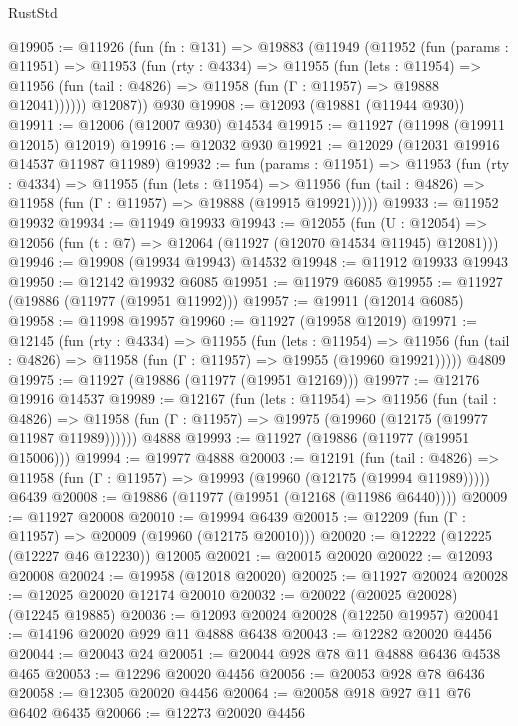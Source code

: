 \begin{lexlean}{RustStd}
\begin{coremodule}
@19905 := @11926
    (fun (fn : @131) =>
    @19883
      (@11949
        (@11952
          (fun (params : @11951) =>
          @11953
            (fun (rty : @4334) =>
            @11955
              (fun (lets : @11954) =>
              @11956 (fun (tail : @4826) => @11958 (fun (Γ : @11957) => @19888 @12041))))))
        @12087))
    @930
@19908 := @12093 (@19881 (@11944 @930))
@19911 := @12006 (@12007 @930) @14534
@19915 := @11927 (@11998 (@19911 @12015) @12019)
@19916 := @12032 @930
@19921 := @12029 (@12031 @19916 @14537 @11987 @11989)
@19932 := fun (params : @11951) =>
  @11953
    (fun (rty : @4334) =>
    @11955
      (fun (lets : @11954) =>
      @11956 (fun (tail : @4826) => @11958 (fun (Γ : @11957) => @19888 (@19915 @19921)))))
@19933 := @11952 @19932
@19934 := @11949 @19933
@19943 := @12055
    (fun (U : @12054) => @12056 (fun (t : @7) => @12064 (@11927 (@12070 @14534 @11945) @12081)))
@19946 := @19908 (@19934 @19943) @14532
@19948 := @11912 @19933 @19943
@19950 := @12142 @19932 @6085
@19951 := @11979 @6085
@19955 := @11927 (@19886 (@11977 (@19951 @11992)))
@19957 := @19911 (@12014 @6085)
@19958 := @11998 @19957
@19960 := @11927 (@19958 @12019)
@19971 := @12145
    (fun (rty : @4334) =>
    @11955
      (fun (lets : @11954) =>
      @11956 (fun (tail : @4826) => @11958 (fun (Γ : @11957) => @19955 (@19960 @19921)))))
    @4809
@19975 := @11927 (@19886 (@11977 (@19951 @12169)))
@19977 := @12176 @19916 @14537
@19989 := @12167
    (fun (lets : @11954) =>
    @11956
      (fun (tail : @4826) =>
      @11958 (fun (Γ : @11957) => @19975 (@19960 (@12175 (@19977 @11987 @11989))))))
    @4888
@19993 := @11927 (@19886 (@11977 (@19951 @15006)))
@19994 := @19977 @4888
@20003 := @12191
    (fun (tail : @4826) => @11958 (fun (Γ : @11957) => @19993 (@19960 (@12175 (@19994 @11989)))))
    @6439
@20008 := @19886 (@11977 (@19951 (@12168 (@11986 @6440))))
@20009 := @11927 @20008
@20010 := @19994 @6439
@20015 := @12209 (fun (Γ : @11957) => @20009 (@19960 (@12175 @20010)))
@20020 := @12222 (@12225 (@12227 @46 @12230)) @12005
@20021 := @20015 @20020
@20022 := @12093 @20008
@20024 := @19958 (@12018 @20020)
@20025 := @11927 @20024
@20028 := @12025 @20020 @12174 @20010
@20032 := @20022 (@20025 @20028) (@12245 @19885)
@20036 := @12093 @20024 @20028 (@12250 @19957)
@20041 := @14196 @20020 @929 @11 @4888 @6438
@20043 := @12282 @20020 @4456
@20044 := @20043 @24
@20051 := @20044 @928 @78 @11 @4888 @6436 @4538 @465
@20053 := @12296 @20020 @4456
@20056 := @20053 @928 @78 @6436
@20058 := @12305 @20020 @4456
@20064 := @20058 @918 @927 @11 @76 @6402 @6435
@20066 := @12273 @20020 @4456

\end{coremodule}
\end{lexlean}
